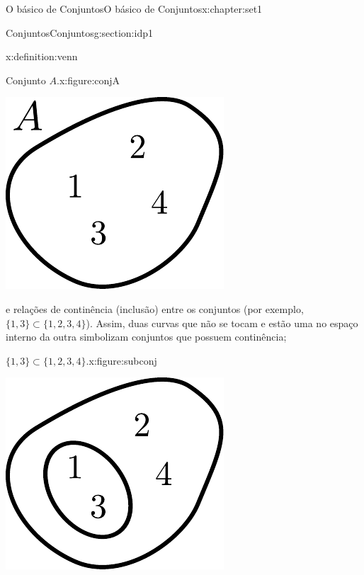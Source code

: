 \documentclass[oneside,10pt,]{book}
\numberwithin{equation}{section}
\begin{document}
\begin{chapterptx}{O básico de Conjuntos}{}{O básico de Conjuntos}{}{}{x:chapter:set1}
\begin{sectionptx}{Conjuntos}{}{Conjuntos}{}{}{g:section:idp1}
\begin{definition}{}{x:definition:venn}
\begin{figureptx}{Conjunto \(A\).}{x:figure:conjA}{}
\begin{image}{0.35}{0.3}{0.35}%
\includegraphics[width=\linewidth]{images/conjA}
\end{image}%
\tcblower
\end{figureptx}%
 e relações de continência (inclusão) entre os conjuntos (por exemplo, \(\{1, 3\} \subset \{1, 2, 3, 4\}\)). Assim, duas curvas que não se tocam e estão uma no espaço interno da outra simbolizam conjuntos que possuem continência; \begin{figureptx}{\(\{1, 3\} \subset \{1, 2, 3, 4\}\).}{x:figure:subconj}{}%
\begin{image}{0.35}{0.3}{0.35}%
\includegraphics[width=\linewidth]{images/subconj}

\end{image}
\end{figureptx}
\end{definition}
\end{sectionptx}
\end{chapterptx}
\end{document}

